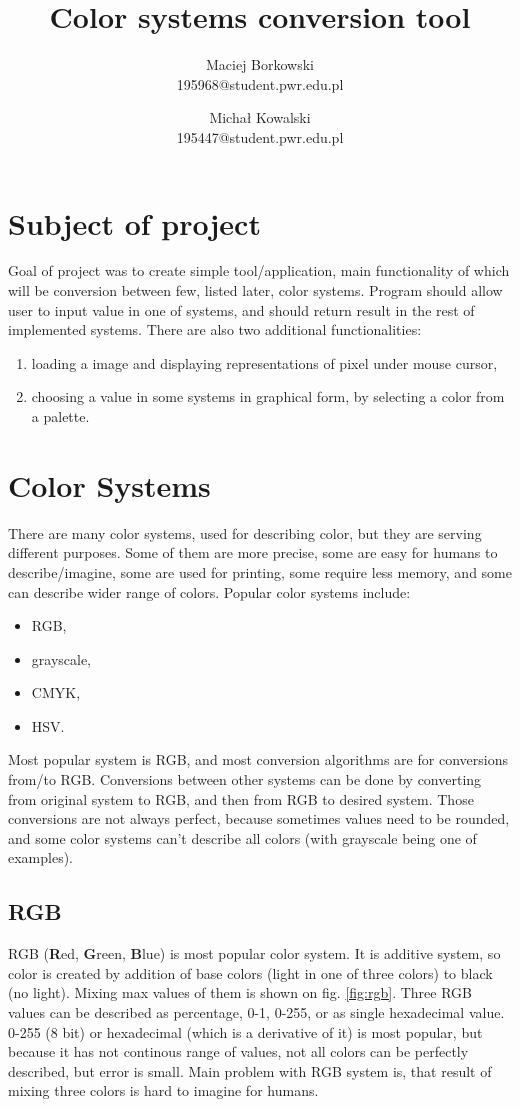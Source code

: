 \documentclass[titlepage]{article}
\title{Color systems conversion tool}
\author{Maciej Borkowski\\ 195968@student.pwr.edu.pl \and Michał Kowalski \\ 195447@student.pwr.edu.pl}
\date{}
\begin{document}
\maketitle

\section{Subject of project}
Goal of project was to create simple tool/application, main functionality of
which will be conversion between few, listed later, color systems. Program
should allow user to input value in one of systems, and should return result in
the rest of implemented systems. There are also two additional functionalities:
\begin{enumerate}
  \item loading a image and displaying representations of pixel under mouse
  cursor,
  \item choosing a value in some systems in graphical form, by selecting a color
  from a palette.
\end{enumerate}


\section{Color Systems}
There are many color systems, used for describing color, but they are serving
different purposes. Some of them are more precise, some are easy for humans to
describe/imagine, some are used for printing, some require less memory, and some
can describe wider range of colors.
Popular color systems include:
\begin{itemize}
  \item RGB,
  \item grayscale,
  \item CMYK,
  \item HSV.
\end{itemize}
Most popular system is RGB, and most conversion algorithms are for conversions
from/to RGB. Conversions between other systems can be done by converting from
original system to RGB, and then from RGB to desired system. Those conversions
are not always perfect, because sometimes values need to be rounded, and some
color systems can't describe all colors (with grayscale being one of examples).

\subsection{RGB}
RGB (\textbf{R}ed, \textbf{G}reen, \textbf{B}lue) is most popular color system.
It is additive system, so color is created by addition of base colors (light in
one of three colors) to black (no light). Mixing max values of them is shown on
fig. \ref{fig:rgb}. Three RGB values can be described as percentage, 0-1, 0-255,
or as single hexadecimal value. 0-255 (8 bit) or hexadecimal (which is a
derivative of it) is most popular, but because it has not continous range of
values, not all colors can be perfectly described, but error is small. Main
problem with RGB system is, that result of mixing three colors is hard to
imagine for humans.
\end{document}
